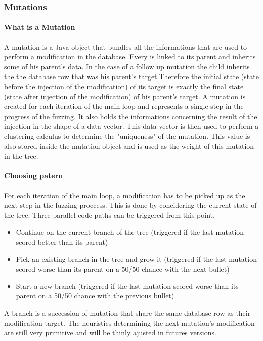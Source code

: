 \documentclass{article}
\begin{document}
  				
			\subsubsection{Mutations}
				\paragraph{What is a Mutation}
A mutation is a Java object that bundles all the informations that are used to perform a modification in the database. Every is linked to its parent and inherits some of his parent's data. In the case of a follow up mutation the child inherits the the database row that was his parent's target.Therefore the initial state (state before the injection of the modification) of its target is exactly the final state (state after injection of the modification) of his parent's target. A mutation is created for each iteration of the main loop and represents a single step in the progress of the fuzzing.
It also holds the informations concerning the result of the injection in the shape of a data vector. This data vector is then used to perform a clustering calculus to determine the "uniqueness" of the mutation. This value is also stored inside the mutation object and is used as the weight of this mutation in the tree.  				
				\paragraph{Choosing patern}
For each iteration of the main loop, a modification has to be picked up as the next step in the fuzzing proccess. This is done by concidering the current state of the tree.
Three parallel code paths can be triggered from this point.
				\begin{itemize}
				\item{Continue on the current branch of the tree (triggered if the last mutation scored better than its parent)}
				\item{Pick an existing branch in the tree and grow it (triggered if the last mutation scored worse than its parent on a 50/50 chance with the next bullet)}
				\item{Start a new branch (triggered if the last mutation scored worse than its parent on a 50/50 chance with the previous bullet)}
				\end{itemize}
A branch is a succession of mutation that share the same database row as their modification target.
The heuristics determining the next mutation's modification are still very primitive and will be thinly ajusted in futures versions.								 
\end{document}
